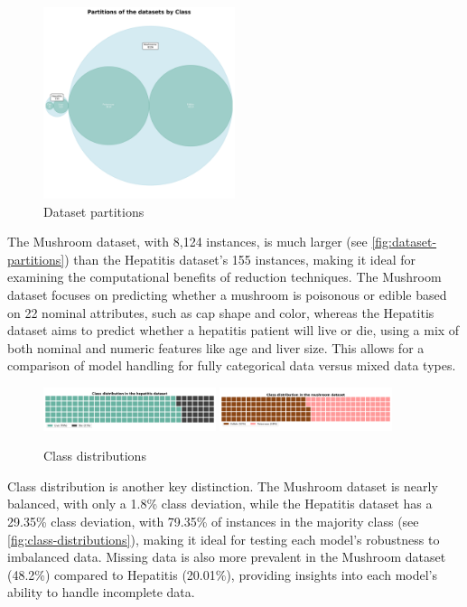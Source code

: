 \begin{figure}
    \centering
    \includegraphics[width=0.5\textwidth]{figures/dataset-partitions.png}
    \caption{Dataset partitions}
    \label{fig:dataset-partitions}
\end{figure}

The Mushroom dataset, with 8,124 instances, is much larger (see \autoref{fig:dataset-partitions}) than the Hepatitis dataset's 155 instances, making it ideal for examining the computational benefits of reduction techniques.
The Mushroom dataset focuses on predicting whether a mushroom is poisonous or edible based on 22 nominal attributes, such as cap shape and color, whereas the Hepatitis dataset aims to predict whether a hepatitis patient will live or die, using a mix of both nominal and numeric features like age and liver size.
This allows for a comparison of model handling for fully categorical data versus mixed data types.

\begin{figure}
    \centering
    \includegraphics[width=0.45\textwidth]{figures/hepatitis-class-distribution.png}
    \includegraphics[width=0.45\textwidth]{figures/mushroom-class-distribution.png}
    \caption{Class distributions}
    \label{fig:class-distributions}
\end{figure}

Class distribution is another key distinction.
The Mushroom dataset is nearly balanced, with only a 1.8\% class deviation, while the Hepatitis dataset has a 29.35\% class deviation, with 79.35\% of instances in the majority class (see \autoref{fig:class-distributions}), making it ideal for testing each model's robustness to imbalanced data.
Missing data is also more prevalent in the Mushroom dataset (48.2\%) compared to Hepatitis (20.01\%), providing insights into each model’s ability to handle incomplete data.